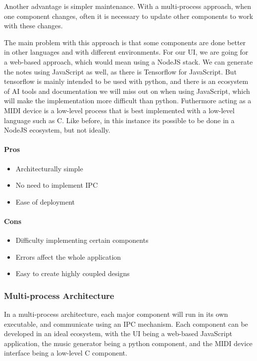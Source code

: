 Another advantage is simpler maintenance. With a multi-process approach, when one
component changes, often it is necessary to update other components to work with these
changes.

The main problem with this approach is that some components are done better in other
languages and with different environments. For our UI, we are going for a web-based
approach, which would mean using a NodeJS stack. We can generate the notes using
JavaScript as well, as there is Tensorflow for JavaScript. But tensorflow is mainly
intended to be used with python, and there is an ecosystem of AI tools and documentation
we will miss out on when using JavaScript, which will make the implementation more
difficult than python. Futhermore acting as a MIDI device is a low-level process that is
best implemented with a low-level language such as C. Like before, in this instance its
possible to be done in a NodeJS ecosystem, but not ideally.

\paragraph{Pros}

\begin{itemize}
  \item Architecturally simple
  \item No need to implement IPC
  \item Ease of deployment
\end{itemize}

\paragraph{Cons}

\begin{itemize}
  \item Difficulty implementing certain components
  \item Errors affect the whole application
  \item Easy to create highly coupled designs
\end{itemize}

\subsubsection{Multi-process Architecture}

In a multi-process architecture, each major component will run in its own executable, and
communicate using an IPC mechanism. Each component can be developed in an ideal ecosystem,
with the UI being a web-based JavaScript application, the music generator being a python
component, and the MIDI device interface being a low-level C component.

